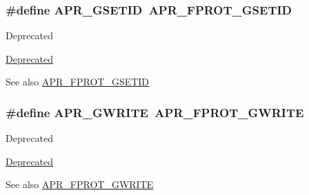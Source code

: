 \subsubsection[{\texorpdfstring{A\+P\+R\+\_\+\+G\+S\+E\+T\+ID}{APR_GSETID}}]{\setlength{\rightskip}{0pt plus 5cm}\#define A\+P\+R\+\_\+\+G\+S\+E\+T\+ID~{\bf A\+P\+R\+\_\+\+F\+P\+R\+O\+T\+\_\+\+G\+S\+E\+T\+ID}}\hypertarget{group__apr__file__permissions_ga4e4e9bb05f2bb156b174461551c9c329}{}\label{group__apr__file__permissions_ga4e4e9bb05f2bb156b174461551c9c329}
\begin{DoxyRefDesc}{Deprecated}
\item[\hyperlink{deprecated__deprecated000014}{Deprecated}]\end{DoxyRefDesc}
\begin{DoxySeeAlso}{See also}
\hyperlink{group__apr__file__permissions_ga5fcf6746afdd4e9b8be6ceab6892a3f5}{A\+P\+R\+\_\+\+F\+P\+R\+O\+T\+\_\+\+G\+S\+E\+T\+ID} 
\end{DoxySeeAlso}
\subsubsection[{\texorpdfstring{A\+P\+R\+\_\+\+G\+W\+R\+I\+TE}{APR_GWRITE}}]{\setlength{\rightskip}{0pt plus 5cm}\#define A\+P\+R\+\_\+\+G\+W\+R\+I\+TE~{\bf A\+P\+R\+\_\+\+F\+P\+R\+O\+T\+\_\+\+G\+W\+R\+I\+TE}}\hypertarget{group__apr__file__permissions_ga794c425b459aa46939f6febabbe9daef}{}\label{group__apr__file__permissions_ga794c425b459aa46939f6febabbe9daef}
\begin{DoxyRefDesc}{Deprecated}
\item[\hyperlink{deprecated__deprecated000016}{Deprecated}]\end{DoxyRefDesc}
\begin{DoxySeeAlso}{See also}
\hyperlink{group__apr__file__permissions_gacecdc9f88b04c768150418688b786500}{A\+P\+R\+\_\+\+F\+P\+R\+O\+T\+\_\+\+G\+W\+R\+I\+TE} 
\end{DoxySeeAlso}
